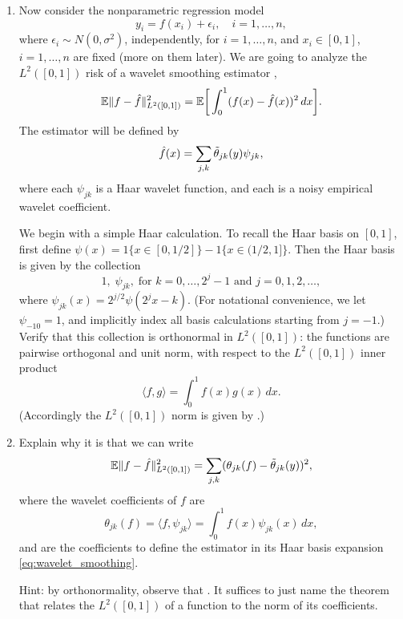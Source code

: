 \documentclass{article}
\begin{document}
\begin{enumerate}[label=(\alph*)]
\item Now consider the nonparametric regression model 
  \begin{equation}
  \label{eq:nonpar_model}
  y_i = f(x_i) + \epsilon_i, \quad i=1,\dots,n,
  \end{equation}
  where $\epsilon_i \sim N(0,\sigma^2)$, independently, for $i=1,\dots,n$, and
  $x_i \in [0,1]$, $i=1,\dots,n$ are fixed (more on them later). We are going to
  analyze the $L^2([0,1])$ risk of a wavelet smoothing estimator \smash{$\hf$},      
  \[
  \mathbb{E} \|f - \hat{f}\|_{L^2([0,1])}^2 = \mathbb{E} \bigg[ \int_0^1 (f(x) -  \hat{f}(x))^2 \, dx \bigg]. 
  \]
  The estimator \smash{$\hf$} will be defined by 
  \begin{equation}
  \label{eq:wavelet_smoothing}
  \hat{f}(x) = \sum_{j,k} \tilde\theta_{jk}(y) \psi_{jk}, 
  \end{equation}
  where each $\psi_{jk}$ is a Haar wavelet function, and each
   is a noisy empirical wavelet coefficient.

  We begin with a simple Haar calculation. To recall the Haar basis on $[0,1]$, 
  first define $\psi(x) = 1\{x \in [0,1/2]\} - 1\{x \in (1/2,1]\}$. Then the
  Haar basis is given by the collection          
  \[
   1, \; \psi_{jk}, \; \text{for $k = 0, \dots, 2^j-1$ and $j = 0,1,2,\dots$},     
  \]
  where $\psi_{jk}(x) = 2^{j/2} \psi(2^j x - k)$. (For notational convenience,
  we let $\psi_{-10} = 1$, and implicitly index all basis calculations starting 
  from $j=-1$.) Verify that this collection is orthonormal in $L^2([0,1])$: the
  functions are pairwise orthogonal and unit norm, with respect to the
  $L^2([0,1])$ inner product    
  \marginpar{\small [2 pts]}
  \[
  \langle f, g \rangle = \int_0^1 f(x) g(x) \, dx.
  \]
  (Accordingly the $L^2([0,1])$ norm is given by .) 

\item Explain why it is that we can write
  \marginpar{\small [1 pt]}
  \[
  \mathbb{E} \|f - \hat{f}\|_{L^2([0,1])}^2 = \sum_{j,k} (\theta_{jk}(f) - \tilde\theta_{jk}(y))^2,
  \]
  where the wavelet coefficients of $f$ are 
  \[
  \theta_{jk}(f) = \langle f, \psi_{jk} \rangle = \int_0^1 f(x) \psi_{jk}(x) \,
  dx,
  \]
  and  are the coefficients to define the estimator
  \smash{$\hf$} in its Haar basis expansion \eqref{eq:wavelet_smoothing}.    

  Hint: by orthonormality, observe that . It suffices to just name the theorem that relates the
  $L^2([0,1])$ of a function to the norm of its coefficients.  


\end{enumerate}
\end{document}
